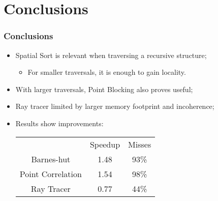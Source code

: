 \section{Conclusions}
\begin{frame}
	\frametitle{Conclusions}
	\begin{itemize}\itemsep=15pt
		\item Spatial Sort is relevant when traversing a recursive structure;
		\begin{itemize}
			\item For smaller traversals, it is enough to gain locality.
		\end{itemize}

		\item With larger traversals, Point Blocking also proves useful;

		\item Ray tracer limited by larger memory footprint and incoherence;

		\item Results show improvements:
		\begin{table}
			\begin{tabular}{|c|cc|}
				& Speedup & Misses	\\
				Barnes-hut &  1.48 & 93\%	\\
				Point Correlation & 1.54 & 98\%	\\
				Ray Tracer & 0.77 & 44\%
			\end{tabular}
		\end{table}
	\end{itemize}
\end{frame}
